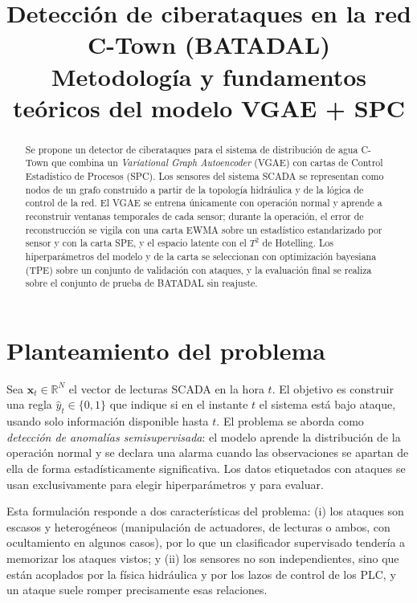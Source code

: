 \documentclass[11pt,a4paper]{article}
\title{Detección de ciberataques en la red C-Town (BATADAL)\\[4pt]
\large Metodología y fundamentos teóricos del modelo VGAE + SPC}
\author{}
\date{}
\newcommand{\R}{\mathbb{R}}
\begin{document}
\maketitle

\begin{abstract}
Se propone un detector de ciberataques para el sistema de distribución de agua C-Town
que combina un \emph{Variational Graph Autoencoder} (VGAE) con cartas de Control
Estadístico de Procesos (SPC). Los sensores del sistema SCADA se representan como
nodos de un grafo construido a partir de la topología hidráulica y de la lógica de
control de la red. El VGAE se entrena únicamente con operación normal y aprende a
reconstruir ventanas temporales de cada sensor; durante la operación, el error de
reconstrucción se vigila con una carta EWMA sobre un estadístico estandarizado por
sensor y con la carta SPE, y el espacio latente con el $T^2$ de Hotelling. Los
hiperparámetros del modelo y de
la carta se seleccionan con optimización bayesiana (TPE) sobre un conjunto de
validación con ataques, y la evaluación final se realiza sobre el conjunto de prueba
de BATADAL sin reajuste.
\end{abstract}

\tableofcontents
\newpage

\section{Planteamiento del problema}

Sea $\mathbf{x}_t\in\R^{N}$ el vector de lecturas SCADA en la hora $t$. El objetivo es
construir una regla $\hat y_t\in\{0,1\}$ que indique si en el instante $t$ el sistema
está bajo ataque, usando solo información disponible hasta $t$. El problema se aborda
como \emph{detección de anomalías semisupervisada}: el modelo aprende la distribución
de la operación normal y se declara una alarma cuando las observaciones se apartan
de ella de forma estadísticamente significativa. Los datos etiquetados con ataques se
usan exclusivamente para elegir hiperparámetros y para evaluar.

Esta formulación responde a dos características del problema: (i) los ataques son
escasos y heterogéneos (manipulación de actuadores, de lecturas o ambos, con
ocultamiento en algunos casos), por lo que un clasificador supervisado tendería a
memorizar los ataques vistos; y (ii) los sensores no son independientes, sino que
están acoplados por la física hidráulica y por los lazos de control de los PLC, y
un ataque suele romper precisamente esas relaciones.
\end{document}
